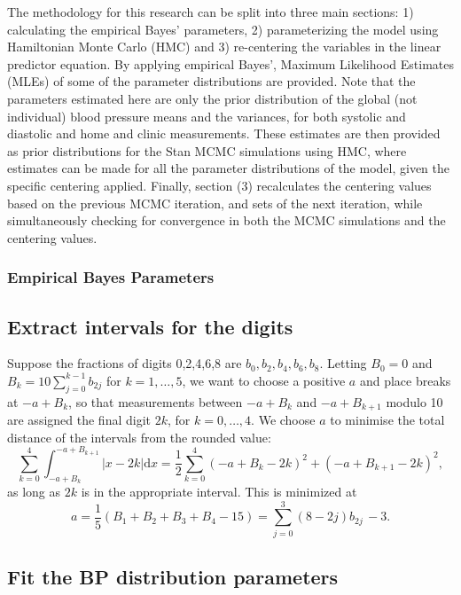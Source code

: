 \documentclass[
]{article}
\begin{document}
The methodology for this research can be split into three main sections:
1) calculating the empirical Bayes' parameters, 2) parameterizing the
model using Hamiltonian Monte Carlo (HMC) and 3) re-centering the
variables in the linear predictor equation. By applying empirical
Bayes', Maximum Likelihood Estimates (MLEs) of some of the parameter
distributions are provided. Note that the parameters estimated here are
only the prior distribution of the global (not individual) blood
pressure means and the variances, for both systolic and diastolic and
home and clinic measurements. These estimates are then provided as prior
distributions for the Stan MCMC simulations using HMC, where estimates
can be made for all the parameter distributions of the model, given the
specific centering applied. Finally, section (3) recalculates the
centering values based on the previous MCMC iteration, and sets of the
next iteration, while simultaneously checking for convergence in both
the MCMC simulations and the centering values.

\hypertarget{empirical-bayes-parameters}{%
\subsubsection{Empirical Bayes
Parameters}\label{empirical-bayes-parameters}}

\hypertarget{extract-intervals-for-the-digits}{%
\subsection{Extract intervals for the
digits}\label{extract-intervals-for-the-digits}}

Suppose the fractions of digits 0,2,4,6,8 are \(b_0,b_2,b_4,b_6,b_8\).
Letting \(B_0=0\) and \(B_k=10\sum_{j=0}^{k-1}b_{2j}\) for
\(k=1,\dots,5\), we want to choose a positive \(a\) and place breaks at
\(-a+B_k\), so that measurements between \(-a+B_k\) and \(-a+B_{k+1}\)
modulo 10 are assigned the final digit \(2k\), for \(k=0,\dots,4\). We
choose \(a\) to minimise the total distance of the intervals from the
rounded value: \[
  \sum_{k=0}^4 \int_{-a+B_k}^{-a+B_{k+1}} \bigl| x-2k\bigr|\mathrm{d} x=\frac12\sum_{k=0}^4 \left(-a+B_k-2k\right)^2 + \left(-a+B_{k+1}-2k\right)^2,
\] as long as \(2k\) is in the appropriate interval. This is minimized
at \[
  a= \frac{1}{5}\left(B_1+B_2+B_3+B_4 - 15\right)=\sum_{j=0}^3 (8-2j) b_{2j} \, - 3.
\]

\hypertarget{fit-the-bp-distribution-parameters}{%
\subsection{Fit the BP distribution
parameters}\label{fit-the-bp-distribution-parameters}}
\end{document}
